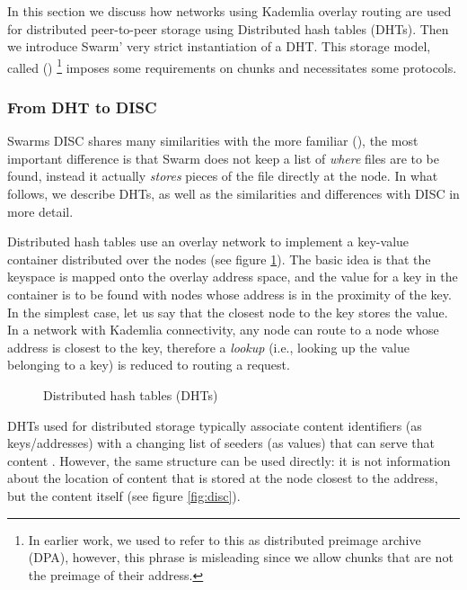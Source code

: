In this section we discuss how  networks using Kademlia overlay routing are used for distributed peer-to-peer storage using Distributed hash tables (DHTs). Then we introduce Swarm' very strict instantiation of a DHT. This storage model, called  ()%
%
\footnote{In earlier work, we used to refer to this as distributed preimage archive (DPA), however, this phrase is misleading since we allow chunks that are not the preimage of their address.}
imposes some requirements on chunks and necessitates some  protocols.
 
\subsubsection{From DHT to DISC}
 Swarms DISC shares many similarities with the more familiar  (), the most important difference is that Swarm does not keep a list of \emph{where} files are to be found, instead it actually \emph{stores} pieces of the file directly at the node. 
 In what follows, we describe DHTs, as well as the similarities and differences with DISC in more detail. 
 
Distributed hash tables use an overlay network to implement a key-value container distributed over the nodes (see figure \ref{fig:DHT}). The basic idea is that the keyspace is mapped onto the overlay address space, and the value for a key in the container is to be found with nodes whose address is in the proximity of the key. In the simplest case, let us say that the closest node to the key stores the value. In a network with Kademlia connectivity, any node can route to a node whose address is closest to the key, therefore a \emph{lookup} (i.e., looking up the value belonging to a key) is reduced to routing a request. 

\begin{figure}[htbp]
   \centering
   \caption[Distributed hash tables (DHTs)]{Distributed hash tables (DHTs)}
   \label{fig:DHT}
\end{figure}

DHTs used for distributed storage typically associate content identifiers (as keys/addresses) with a changing list of seeders (as values) that can serve that content \cite{ipfs2014, bittorrent}. However, the same structure can be used directly: it is not information about the location of content that is stored at the node closest to the address, but the content itself (see figure \ref{fig:disc}). 

